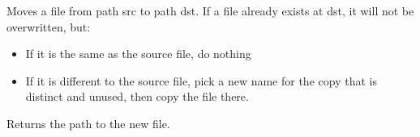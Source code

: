 \documentclass[letterpaper,10pt,english]{sphinxmanual}
\begin{document}

\begin{fulllineitems}
\label{\detokenize{pgamit.classes:pgamit.classes.Utils.lg2ct}}
\pysigstartsignatures
\pysiglinewithargsret
{}
{\sphinxparamcomma {}\sphinxparamcomma {}\sphinxparamcomma {}\sphinxparamcomma {}}
{}
\pysigstopsignatures
\end{fulllineitems}


\begin{fulllineitems}
\label{\detokenize{pgamit.classes:pgamit.classes.Utils.ll2sphere_xyz}}
\pysigstartsignatures
\pysiglinewithargsret
{}
{}
{}
\pysigstopsignatures
\end{fulllineitems}


\begin{fulllineitems}
\label{\detokenize{pgamit.classes:pgamit.classes.Utils.move}}
\pysigstartsignatures
\pysiglinewithargsret
{}
{\sphinxparamcomma {}}
{}
\pysigstopsignatures
\sphinxAtStartPar
Moves a file from path src to path dst.
If a file already exists at dst, it will not be overwritten, but:
\begin{itemize}
\item {} 
\sphinxAtStartPar
If it is the same as the source file, do nothing

\item {} 
\sphinxAtStartPar
If it is different to the source file, pick a new name for the copy that
is distinct and unused, then copy the file there.

\end{itemize}

\sphinxAtStartPar
Returns the path to the new file.

\end{fulllineitems}
\end{document}

